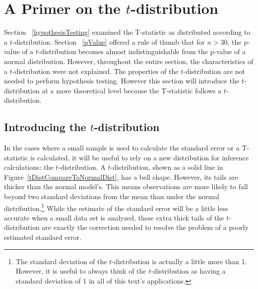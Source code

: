 

\section{A Primer on the $t$-distribution}
\label{tdistribution}

Section ~\ref{hypothesisTesting} examined the T-statistic as distributed according to a $t$-distribution. Section ~\ref{pValue} offered a rule of thumb that for $n>30$, the p-value of a $t$-distribution becomes almost indistinguishable from the p-value of a normal distribution. However, throughout the entire section, the characteristics of a $t$-distribution were not explained. The properties of the $t$-distribution are not needed to perform hypothesis testing. However this section will introduce the $t$-distribution at a more theoretical level because the T-statistic follows a $t$-distribution. 

\subsection{Introducing the $t$-distribution}
\label{introducingTheTDistribution}


In the cases where a small sample is used to calculate the standard error or a T-statistic is calculated, it will be useful to rely on a new distribution for inference calculations: the $t$-distribution. A $t$-distribution, shown as a solid line in Figure~\ref{tDistCompareToNormalDist}, has a bell shape. However, its tails are thicker than the normal model's. This means observations are more likely to fall beyond two standard deviations from the mean than under the normal distribution.\footnote{The standard deviation of the $t$-distribution is actually a little more than 1. However, it is useful to always think of the $t$-distribution as having a standard deviation of 1 in all of this text's applications.} While the estimate of the standard error will be a little less accurate when a small data set is analyzed, these extra thick tails of the $t$-distribution are exactly the correction needed to resolve the problem of a poorly estimated standard error.

